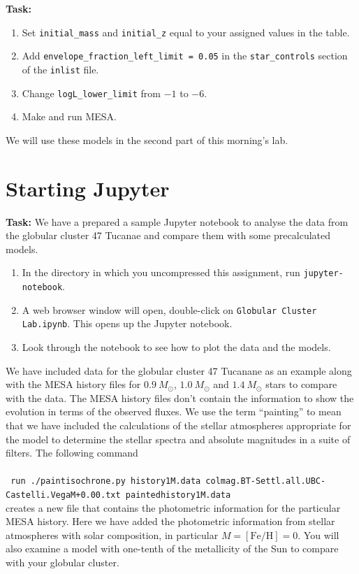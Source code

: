 \documentclass{article}
\begin{document}
{\bf Task:}
\begin{enumerate}
 \setlength\itemsep{0em}
    \item 
Set \texttt{initial\_mass} and \texttt{initial\_z} equal to your assigned values in the table.  
\item Add  \texttt{envelope\_fraction\_left\_limit = 0.05} in the \texttt{star\_controls} section of the \texttt{inlist} file. 
\item Change \texttt{logL\_lower\_limit} from $-1$ to $-6$.
\item Make and run MESA.
\end{enumerate}
We will use these models in the second part of this morning's lab.

\section{Starting Jupyter}

\textbf{Task:} We have a prepared a sample Jupyter notebook to analyse the data from the globular cluster 47 Tucanae and compare them with some precalculated models.   
\begin{enumerate}
 \setlength\itemsep{0em}
\item
In the directory in which you uncompressed this assignment, run \texttt{jupyter-notebook}.
\item
A web browser window will open, double-click on \texttt{Globular Cluster Lab.ipynb}.  This opens up the Jupyter notebook.
\item
Look through the notebook to see how to plot the data and the models. 
\end{enumerate}
We have included data for the globular cluster 47 Tucanane as an example along with the MESA history files for  $0.9~M_\odot$, $1.0~M_\odot$ and $1.4~M_\odot$ stars to compare with the data.   The MESA history files don't contain the information to show the evolution in terms of the observed fluxes.  We use the term ``painting'' to mean that we have included the calculations of the stellar atmospheres appropriate for the model to determine the stellar spectra and absolute magnitudes in a suite of filters.  The following command \\
\\
{\small{
\texttt{
    run ./paintisochrone.py history1M.data colmag.BT-Settl.all.UBC-Castelli.VegaM+0.00.txt paintedhistory1M.data
}
}}\\
creates a new file that contains the photometric information for the particular MESA history.  Here we have added the photometric information from stellar atmospheres with solar composition, in particular $M=[\textrm{Fe/H}]=0$.  You will also examine a model with one-tenth of the metallicity of the Sun to compare with your globular cluster.
\end{document}
